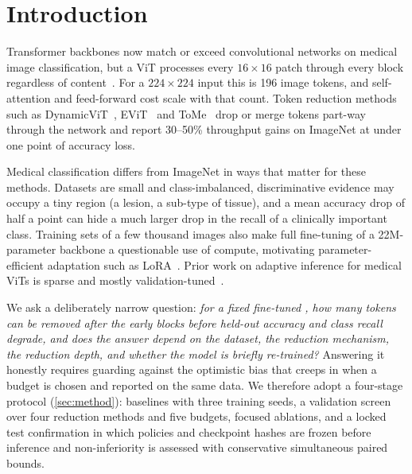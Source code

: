 \section{Introduction}
\label{sec:intro}

Transformer backbones now match or exceed convolutional networks on medical image classification, but a ViT processes every $16\times16$ patch through every block regardless of content~\cite{dosovitskiy2021vit,touvron2021deit}. For a $224\times224$ input this is 196 image tokens, and self-attention and feed-forward cost scale with that count. Token reduction methods such as DynamicViT~\cite{rao2021dynamicvit}, EViT~\cite{liang2022evit} and ToMe~\cite{bolya2023tome} drop or merge tokens part-way through the network and report 30--50\% throughput gains on ImageNet at under one point of accuracy loss.

Medical classification differs from ImageNet in ways that matter for these methods. Datasets are small and class-imbalanced, discriminative evidence may occupy a tiny region (a lesion, a sub-type of tissue), and a mean accuracy drop of half a point can hide a much larger drop in the recall of a clinically important class. Training sets of a few thousand images also make full fine-tuning of a 22M-parameter backbone a questionable use of compute, motivating parameter-efficient adaptation such as LoRA~\cite{hu2022lora}. Prior work on adaptive inference for medical ViTs is sparse and mostly validation-tuned~\cite{byun2026adaptive,zhou2023tokensparse}.

We ask a deliberately narrow question: \emph{for a fixed fine-tuned \deit, how many tokens can be removed after the early blocks before held-out accuracy and class recall degrade, and does the answer depend on the dataset, the reduction mechanism, the reduction depth, and whether the model is briefly re-trained?} Answering it honestly requires guarding against the optimistic bias that creeps in when a budget is chosen and reported on the same data. We therefore adopt a four-stage protocol (\cref{sec:method}): baselines with three training seeds, a validation screen over four reduction methods and five budgets, focused ablations, and a locked test confirmation in which policies and checkpoint hashes are frozen before inference and non-inferiority is assessed with conservative simultaneous paired bounds.

